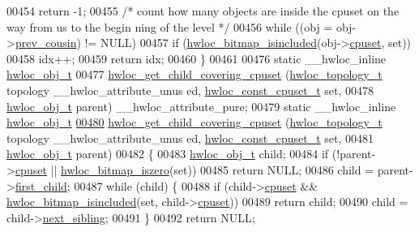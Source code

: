 \begin{DoxyCode}
00454     \textcolor{keywordflow}{return} -1;
00455   \textcolor{comment}{/* count how many objects are inside the cpuset on the way from us to the begin
      ning of the level */}
00456   \textcolor{keywordflow}{while} ((obj = obj->\hyperlink{a00016_ac715989f55ff5a0eb6be2969ee477ec0}{prev_cousin}) != NULL)
00457     \textcolor{keywordflow}{if} (\hyperlink{a00065_gaae29e14a926c198e8f91e6e4790621e7}{hwloc_bitmap_isincluded}(obj->\hyperlink{a00016_a67925e0f2c47f50408fbdb9bddd0790f}{cpuset}, \textcolor{keyword}{set}))
00458       idx++;
00459   \textcolor{keywordflow}{return} idx;
00460 \}
00461 
00476 \textcolor{keyword}{static} \_\_hwloc\_inline \hyperlink{a00016}{hwloc_obj_t}
00477 \hyperlink{a00055_ga69a22cc76c88115aee7b7e6fc53fca7d}{hwloc_get_child_covering_cpuset} (\hyperlink{a00039_ga9d1e76ee15a7dee158b786c30b6a6e38}{hwloc_topology_t} topology \_\_hwloc\_attribute\_unus
      ed, \hyperlink{a00040_ga1f784433e9b606261f62d1134f6a3b25}{hwloc_const_cpuset_t} \textcolor{keyword}{set},
00478                                 \hyperlink{a00016}{hwloc_obj_t} parent) \_\_hwloc\_attribute\_pure;
00479 \textcolor{keyword}{static} \_\_hwloc\_inline \hyperlink{a00016}{hwloc_obj_t}
\hypertarget{a00031_source_l00480}{}\hyperlink{a00055_ga69a22cc76c88115aee7b7e6fc53fca7d}{00480} \hyperlink{a00055_ga69a22cc76c88115aee7b7e6fc53fca7d}{hwloc_get_child_covering_cpuset} (\hyperlink{a00039_ga9d1e76ee15a7dee158b786c30b6a6e38}{hwloc_topology_t} topology \_\_hwloc\_attribute\_unus
      ed, \hyperlink{a00040_ga1f784433e9b606261f62d1134f6a3b25}{hwloc_const_cpuset_t} \textcolor{keyword}{set},
00481                                 \hyperlink{a00016}{hwloc_obj_t} parent)
00482 \{
00483   \hyperlink{a00016}{hwloc_obj_t} child;
00484   \textcolor{keywordflow}{if} (!parent->\hyperlink{a00016_a67925e0f2c47f50408fbdb9bddd0790f}{cpuset} || \hyperlink{a00065_gaa94fed35d2a598bc4a8657b6955b7bf5}{hwloc_bitmap_iszero}(\textcolor{keyword}{set}))
00485     \textcolor{keywordflow}{return} NULL;
00486   child = parent->\hyperlink{a00016_af51d08a0a79dba517c06c5afedc8d2dc}{first_child};
00487   \textcolor{keywordflow}{while} (child) \{
00488     \textcolor{keywordflow}{if} (child->\hyperlink{a00016_a67925e0f2c47f50408fbdb9bddd0790f}{cpuset} && \hyperlink{a00065_gaae29e14a926c198e8f91e6e4790621e7}{hwloc_bitmap_isincluded}(\textcolor{keyword}{set}, child->\hyperlink{a00016_a67925e0f2c47f50408fbdb9bddd0790f}{cpuset}))
00489       \textcolor{keywordflow}{return} child;
00490     child = child->\hyperlink{a00016_a7f2343ed476fe4942e6fffd4cade1b40}{next_sibling};
00491   \}
00492   \textcolor{keywordflow}{return} NULL;

\end{DoxyCode}
